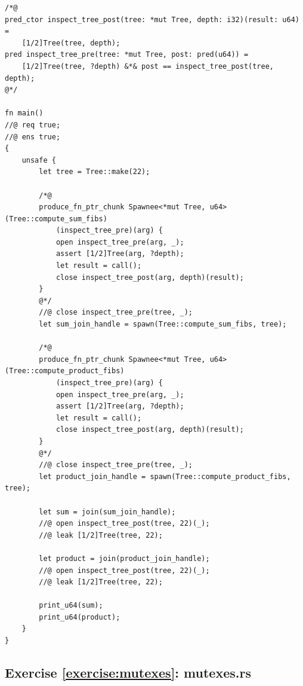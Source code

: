 \documentclass{article}
\begin{document}
\begin{lstlisting}
/*@
pred_ctor inspect_tree_post(tree: *mut Tree, depth: i32)(result: u64) =
    [1/2]Tree(tree, depth);
pred inspect_tree_pre(tree: *mut Tree, post: pred(u64)) =
    [1/2]Tree(tree, ?depth) &*& post == inspect_tree_post(tree, depth);
@*/

fn main()
//@ req true;
//@ ens true;
{
    unsafe {
        let tree = Tree::make(22);
        
        /*@
        produce_fn_ptr_chunk Spawnee<*mut Tree, u64>(Tree::compute_sum_fibs)
            (inspect_tree_pre)(arg) {
            open inspect_tree_pre(arg, _);
            assert [1/2]Tree(arg, ?depth);
            let result = call();
            close inspect_tree_post(arg, depth)(result);
        }
        @*/
        //@ close inspect_tree_pre(tree, _);
        let sum_join_handle = spawn(Tree::compute_sum_fibs, tree);
        
        /*@
        produce_fn_ptr_chunk Spawnee<*mut Tree, u64>(Tree::compute_product_fibs)
            (inspect_tree_pre)(arg) {
            open inspect_tree_pre(arg, _);
            assert [1/2]Tree(arg, ?depth);
            let result = call();
            close inspect_tree_post(arg, depth)(result);
        }
        @*/
        //@ close inspect_tree_pre(tree, _);
        let product_join_handle = spawn(Tree::compute_product_fibs, tree);
        
        let sum = join(sum_join_handle);
        //@ open inspect_tree_post(tree, 22)(_);
        //@ leak [1/2]Tree(tree, 22);
        
        let product = join(product_join_handle);
        //@ open inspect_tree_post(tree, 22)(_);
        //@ leak [1/2]Tree(tree, 22);
        
        print_u64(sum);
        print_u64(product);
    }
}
\end{lstlisting}

\subsection{Exercise \ref{exercise:mutexes}:
mutexes.rs}\label{solution:mutexes}
\end{document}

